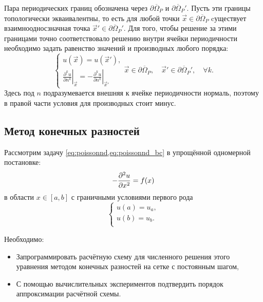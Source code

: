 Пара периодических границ обозначена через $\partial\overline\Omega_P$ и $\partial\overline\Omega_P'$.
Пусть эти границы топологически экваивалентны, то есть для любой точки $\vec x\in\partial\overline\Omega_P$
cуществует взаимноодносзначная точка $\vec x'\in\partial\overline\Omega_P'$.
Для того, чтобы решение за этими границами точно соответствовало решению внутри ячейки периодичности необходимо
задать равенство значений и производных любого порядка:
\begin{equation}
\label{eq:poissonnd_bcp}
\left\{
\begin{array}{l}
    u(\vec x) = u(\vec x'), \\ [10pt]
    \left.\displaystyle\frac{\partial^k u}{\partial n^k}\right|_{\vec x} = -\left.\displaystyle\frac{\partial^k u}{\partial n^k}\right|_{\vec x'}
\end{array}
\right.
\vec x\in\partial\overline\Omega_P, \quad \vec x'\in\partial\overline\Omega_P', \quad \forall k.
\end{equation}
Здесь под $n$ подразумевается внешняя к ячейке периодичности нормаль, поэтому в правой части
условия для производных стоит минус.



\subsection{Метод конечных разностей}
Рассмотрим задачу \cref{eq:poissonnd,eq:poissonnd_bc} в упрощённой одномерной постановке:
\begin{equation}
    \label{eq:poisson1d}
    -\dfrac{\partial^2 u}{\partial x^2} = f(x)
\end{equation}
в области $x\in[a,b]$ с граничными условиями первого рода
\begin{equation}
	\label{eq:poisson1d_bc}
	\begin{cases}
        u(a)=u_a,\\[5pt]
        u(b)=u_b.\\
	\end{cases}
\end{equation}

Необходимо:
\begin{itemize}
\item 
	Запрограммировать расчётную схему для численного решения этого уравнения методом конечных разностей
	на сетке с постоянным шагом,
\item
	С помощью вычислительных экспериментов подтвердить порядок аппроксимации расчётной схемы.
\end{itemize}

